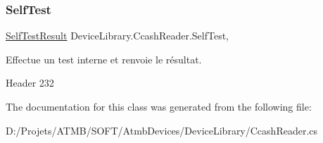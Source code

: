 \subsubsection{\texorpdfstring{Self\+Test}{SelfTest}}
{\footnotesize\ttfamily \mbox{\hyperlink{group___erreur_ga179570d2d8f6f95d52ccafb98d20c790}{Self\+Test\+Result}} Device\+Library.\+Ccash\+Reader.\+Self\+Test\hspace{0.3cm}{\ttfamily [get]}, {\ttfamily [protected]}}



Effectue un test interne et renvoie le résultat. 

Header 232

The documentation for this class was generated from the following file\+:\begin{DoxyCompactItemize}
\item 
D\+:/\+Projets/\+A\+T\+M\+B/\+S\+O\+F\+T/\+Atmb\+Devices/\+Device\+Library/Ccash\+Reader.\+cs\end{DoxyCompactItemize}
